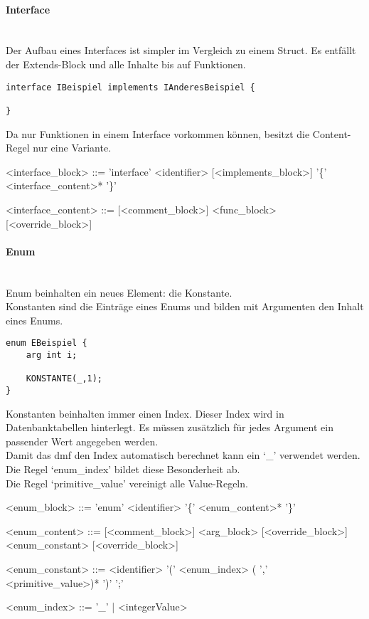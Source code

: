 \documentclass[./einleitung.tex]{subfiles}
\begin{document}
\paragraph{Interface}\mbox{}\\
Der Aufbau eines Interfaces ist simpler im Vergleich zu einem Struct.
Es entfällt der Extends-Block und alle Inhalte bis auf Funktionen.
\begin{lstlisting}
interface IBeispiel implements IAnderesBeispiel {

}
\end{lstlisting}
Da nur Funktionen in einem Interface vorkommen können, besitzt die Content-Regel nur eine Variante.
\begin{grammar}
<interface_block> ::= 'interface' <identifier> [<implements_block>] '\{' <interface_content>* '\}'

<interface_content> ::= [<comment_block>] <func_block> [<override_block>]
\end{grammar}

\paragraph{Enum}\mbox{}\\
Enum beinhalten ein neues Element: die Konstante. \\
Konstanten sind die Einträge eines Enums und bilden mit Argumenten den Inhalt eines Enums.
\begin{lstlisting}
enum EBeispiel {
    arg int i;
    
    KONSTANTE(_,1);
}
\end{lstlisting}
Konstanten beinhalten immer einen Index.
Dieser Index wird in Datenbanktabellen hinterlegt.
Es müssen zusätzlich für jedes Argument ein passender Wert angegeben werden. \\
Damit das \acrshort{dmf} den Index automatisch berechnet kann ein `_' verwendet werden.
Die Regel `enum_index' bildet diese Besonderheit ab. \\
Die Regel `primitive_value' vereinigt alle Value-Regeln.
\begin{grammar}
<enum_block> ::= 'enum' <identifier> '\{' <enum_content>* '\}'

<enum_content> ::= [<comment_block>] <arg_block> [<override_block>]
 <enum_constant> [<override_block>]

<enum_constant> ::= <identifier> '(' <enum_index> ( ',' <primitive_value>)* ')' ';'

<enum_index> ::= '_' | <integerValue>
\end{grammar}
\end{document}
